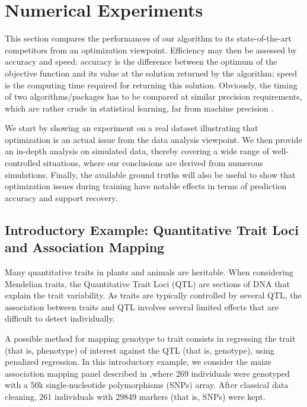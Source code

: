 \section{Numerical Experiments}\label{sec:experiments}

This section compares the performances of our algorithm to its state-of-the-art
competitors from an optimization viewpoint.  Efficiency may then be assessed by
accuracy and speed:  accuracy is the difference between the optimum of the
objective function and its value at the solution returned by the algorithm;
speed is the computing time required for returning this solution.
Obviously, the timing of two algorithms/packages has to be compared at similar
precision requirements, which are rather crude in statistical learning, far from
machine precision \citep{Bottou08}.

We start by showing an experiment on a real dataset illustrating that optimization is an actual issue from the data analysis viewpoint. We then provide an in-depth analysis on simulated data, thereby covering a wide range of well-controlled situations, where  our conclusions are derived from numerous simulations.
Finally, the available ground truths will also be useful to show that optimization issues during training have notable effects in terms of prediction accuracy and support recovery.

\subsection{Introductory Example: Quantitative Trait Loci and Association Mapping}

Many quantitative traits in plants and animals are heritable.  When
considering Mendelian traits, the Quantitative Trait Loci (QTL) are sections of
DNA that explain the trait variability.
As traits are typically controlled by several QTL, the association 
between traits and QTL involves several limited effects that are difficult to detect individually.

A possible method for mapping genotype to trait consists in regressing
the trait (that is, phenotype) of interest  against the QTL (that is, genotype), using penalized regression.
%
In this introductory example, we consider the maize association
mapping panel described in \citep{RincentEtAl2014},where 269
individuals were genotyped with a 50k single-nucleotide polymorphisms (SNPs) array. 
After classical data
cleaning, 261 individuals with 29849 markers (that is, SNPs) were kept.
%

